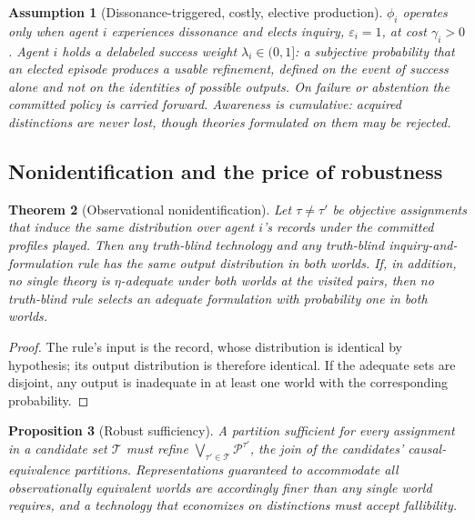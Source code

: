 \documentclass[11pt]{article}
\newtheorem{assumption}{Assumption}[section]
\newtheorem{proposition}[assumption]{Proposition}
\newtheorem{theorem}[assumption]{Theorem}
\begin{document}
\begin{assumption}[Dissonance-triggered, costly, elective production]
\label{ass:elective}
$\phi_i$ operates only when agent $i$ experiences dissonance and elects
inquiry, $\varepsilon_i=1$, at cost $\gamma_i>0$.  Agent $i$ holds a delabeled
success weight $\lambda_i\in(0,1]$: a subjective probability that an elected
episode produces a usable refinement, defined on the event of success alone
and not on the identities of possible outputs.  On failure or abstention the
committed policy is carried forward.  Awareness is cumulative: acquired
distinctions are never lost, though theories formulated on them may be
rejected.
\end{assumption}

\subsection{Nonidentification and the price of robustness}

\begin{theorem}[Observational nonidentification]
\label{thm:nonidentification}
Let $\tau\neq\tau'$ be objective assignments that induce the same distribution
over agent $i$'s records under the committed profiles played.  Then any
truth-blind technology and any truth-blind inquiry-and-formulation rule has
the same output distribution in both worlds.  If, in addition, no single
theory is $\eta$-adequate under both worlds at the visited pairs, then no
truth-blind rule selects an adequate formulation with probability one in both
worlds.
\end{theorem}

\begin{proof}
The rule's input is the record, whose distribution is identical by hypothesis;
its output distribution is therefore identical.  If the adequate sets are
disjoint, any output is inadequate in at least one world with the
corresponding probability.
\end{proof}

\begin{proposition}[Robust sufficiency]
\label{prop:robust-sufficiency}
A partition sufficient for every assignment in a candidate set
$\mathcal T$ must refine $\bigvee_{\tau'\in\mathcal T}\mathcal P^{\tau'}$, the
join of the candidates' causal-equivalence partitions.  Representations
guaranteed to accommodate all observationally equivalent worlds are
accordingly finer than any single world requires, and a technology that
economizes on distinctions must accept fallibility.
\end{proposition}
\end{document}
